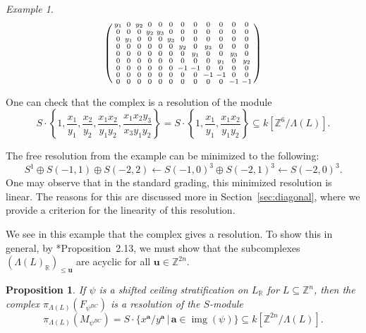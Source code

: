 \documentclass{amsart}
\newcommand{\ZZ}{\mathbb{Z}}
\newcommand{\RR}{\mathbb{R}}
\newcommand{\field}{k}
\DeclareMathOperator{\img}{img}
\newtheorem{proposition}[theorem]{Proposition}
\theoremstyle{remark}
\newtheorem{example}[theorem]{Example}
\begin{document}
\begin{example}
\begin{align*}
\begin{psmallmatrix}
      y_1 & 0   & y_2 & 0   & 0   & 0   &0&0&0&0&0&0\\
      0   & 0   & 0   & y_2 & y_3 & 0   &0&0&0&0&0&0\\
      0   & y_1 & 0   & 0   & 0   & y_3 &0&0&0&0&0&0\\
      0   & 0   & 0   & 0   & 0   & 0   & y_2 & 0 & y_3 &0&0&0\\
      0   & 0   & 0   & 0   & 0   & 0   & 0 &  y_1 & 0  & 0 & y_3 &0\\
      0   & 0   & 0   & 0   & 0   & 0   & 0 &  0   & 0  & y_1  & 0 & y_2 \\
      0   & 0   & 0   & 0   & 0   & 0   & -1& -1& 0 & 0 &0 &0\\
      0   & 0   & 0   & 0   & 0   & 0   & 0 & 0 & -1& -1& 0& 0\\
      0   & 0   & 0   & 0   & 0   & 0   & 0 & 0 & 0 &0 & -1& -1
    \end{psmallmatrix}
  \end{align*}

  One can check that the complex is a resolution of the module
  \[S\cdot \left\{1,\frac{x_1}{y_1},\frac{x_2}{y_2},\frac{x_1x_2}{y_1y_2},\frac{x_1x_2y_3}{x_3y_1y_2}\right\}
  = S\cdot \left\{1,\frac{x_1}{y_1},\frac{x_1x_2}{y_1y_2}\right\} \subseteq \field[\ZZ^6/\Lambda(L)].\]
\end{example}

  
The free resolution from the example can be minimized to the following:
\[S^1\oplus S(-1,1) \oplus S(-2,2) \leftarrow S(-1,0)^3 \oplus S(-2,1)^3 \leftarrow S(-2,0)^3.\]
One may observe that in the standard grading, this minimized resolution is linear.
The reasons for this are discussed more in Section~\ref{sec:diagonal}, where we provide a criterion for the linearity of this resolution.

We see in this example that the complex gives a resolution. To show this in general, by \cite{stratification-paper}*{Proposition~2.13}, we must show that the subcomplexes $(\Lambda(L)_{\RR})_{\leq \bm{u}}$ are acyclic for all $\bm{u}\in \ZZ^{2n}$.

\begin{proposition}
  \label{prop:resolution}
  If $\psi$ is a shifted ceiling stratification on $L_{\RR}$ for $L\subseteq \ZZ^n$, then the complex $\pi_{\Lambda(L)}(F_{\psi^{BC}})$ is a resolution of the $S$-module
  \[\pi_{\Lambda(L)}(M_{\psi^{BC}}) = S\cdot \{x^{\bm{a}}/y^{\bm{a}} \,|\, \bm{a}\in \img(\psi) \} \subseteq \field [\ZZ^{2n}/\Lambda(L)].\]
\end{proposition}
\end{document}
